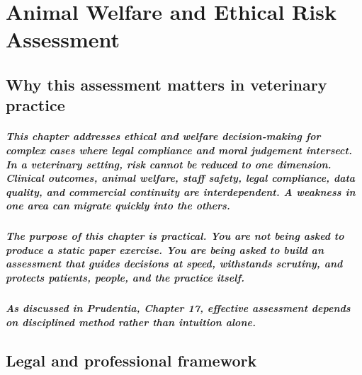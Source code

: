 \chapter{Animal Welfare and Ethical Risk Assessment}
\label{chap:Animal Welfare and Ethical Risk Assessment}

\section{Why this assessment matters in veterinary practice}

\paragraph{This chapter addresses ethical and welfare decision-making for complex cases where legal compliance and moral judgement intersect. In a veterinary setting, risk cannot be reduced to one dimension. Clinical outcomes, animal welfare, staff safety, legal compliance, data quality, and commercial continuity are interdependent. A weakness in one area can migrate quickly into the others.}

\paragraph{The purpose of this chapter is practical. You are not being asked to produce a static paper exercise. You are being asked to build an assessment that guides decisions at speed, withstands scrutiny, and protects patients, people, and the practice itself.}

\paragraph{As discussed in Prudentia, Chapter 17, effective assessment depends on disciplined method rather than intuition alone.}



\section{Legal and professional framework}

